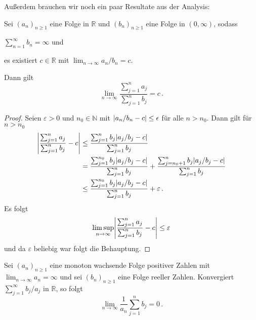 \documentclass[ngerman,a4paper,11pt]{scrartcl}
\newcommand{\NN}{\mathbb{N}}
\newcommand{\RR}{\mathbb{R}}
\DeclarePairedDelimiter{\abs}{\lvert}{\rvert}		%
\begin{document}
Außerdem brauchen wir noch ein paar Resultate aus der Analysis:
\begin{lem}\label{lem:lhospital}
 Sei $(a_n)_{n\geq 1}$ eine Folge in $\RR$ und $(b_n)_{n\geq 1}$ eine Folge in $(0,\infty)$, sodass 
 \begin{thmasslist}
 \item 
     $\sum_{n=1}^\infty b_n=\infty$ und
 \item es existiert $c\in\RR$ mit $\lim_{n\to\infty}a_n/b_n=c$.
 \end{thmasslist}
 Dann gilt
 \begin{equation*}
  \lim_{n\to\infty} \frac{\sum_{j=1}^na_j}{\sum_{j=1}^nb_j}=c\,.
 \end{equation*}
\end{lem}
\begin{proof}
 Seien $\varepsilon >0$ und $n_0\in\NN$ mit $\abs{a_n/b_n-c}\leq\epsilon$
 für alle $n>n_0$. Dann gilt für $n>n_0$
 \begin{align*}
  \abs*{\frac{\sum_{j=1}^na_j}{\sum_{j=1}^nb_j}-c}&\leq\frac{\sum_{j=1}^nb_j\abs{a_j/b_j-c}}{\sum_{j=1}^nb_j} \\
&=\frac{\sum_{j=1}^{n_0}b_j\abs{a_j/b_j-c}}{\sum_{j=1}^nb_j}+\frac{\sum_{j=n_0+1}^nb_j\abs{a_j/b_j-c}}{\sum_{j=1}^nb_j} \\
&\leq\frac{\sum_{j=1}^{n_0}b_j\abs{a_j/b_j-c}}{\sum_{j=1}^nb_j}+\varepsilon\,.
 \end{align*}
Es folgt
\begin{equation*}
  \limsup_{n\to\infty} \abs*{\frac{\sum_{j=1}^na_j}{\sum_{j=1}^nb_j}-c}\leq\varepsilon
\end{equation*}
und da $\varepsilon$ beliebig war folgt die Behauptung.
\end{proof}
\begin{lem}\label{lem:kronecker}
 Sei $(a_n)_{n\geq 1}$ eine monoton wachsende Folge positiver Zahlen mit
 $\lim_{n\to\infty}a_n=\infty$ und sei $(b_n)_{n\geq 1}$ eine Folge reeller
 Zahlen. Konvergiert $\sum_{j=1}^\infty b_j/a_j$ in $\RR$, so folgt
 \begin{equation*}
  \lim_{n\to\infty} \frac{1}{a_n}\sum_{j=1}^nb_j=0\,.
 \end{equation*}
\end{lem}
\end{document}
